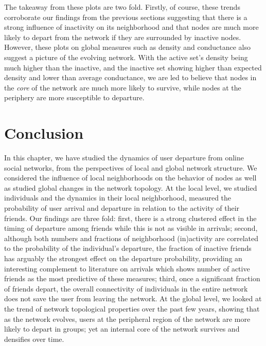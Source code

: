 \documentclass[phd,tocprelim]{cornell}
\begin{document}
The takeaway from these plots are two fold. Firstly, of course, these trends
corroborate our findings from the previous sections suggesting that there is a
strong influence of inactivity on its neighborhood and that nodes are much more
likely to depart from the network if they are surrounded by inactive
nodes. However, these plots on global measures such as density and conductance
also suggest a picture of the evolving network. With the active set's density
being much higher than the inactive, and the inactive set showing higher than
expected density and lower than average conductance, we are led to believe that
nodes in the {\em core} of the network are much more likely to survive, while
nodes at the periphery are more susceptible to departure.

\section{Conclusion}
In this chapter, we have studied the dynamics of user departure from
online social networks, from the perspectives of local and global network structure. 
We considered the influence of local
neighborhoods on the behavior of nodes as well as studied global
changes in the network topology. At the local level, we studied
individuals and the dynamics in their local neighborhood, measured the
probability of user arrival and departure in relation to the
activity of their friends. Our findings are three fold: first, there
is a strong clustered effect in the timing of departure among friends
while this is not as visible in arrivals; second, although both
numbers and fractions of neighborhood (in)activity are correlated to
the probability of the individual's departure, the fraction of
inactive friends has arguably the strongest effect on the departure
probability, providing an interesting complement to literature on arrivals which
shows number of active friends as the most predictive of these
measures; third, once a significant fraction of friends depart, the
overall connectivity of individuals in the entire network does not
save the user from leaving the network. At the global level, we looked
at the trend of network topological properties over the past few
years, showing that as the network evolves, users at the peripheral
region of the network are more likely to depart in groups; yet an internal core
of the network survives and densifies over time. 
\end{document}
